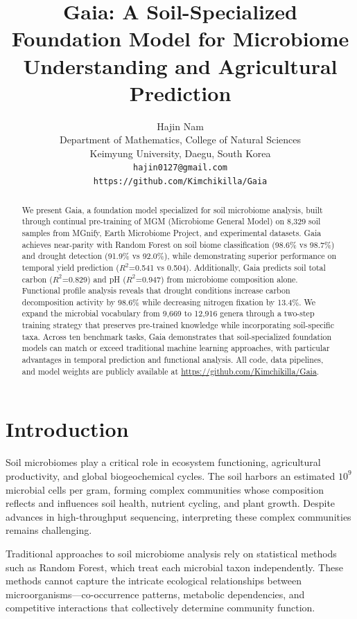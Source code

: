 \documentclass[11pt,a4paper]{article}
\title{Gaia: A Soil-Specialized Foundation Model for Microbiome Understanding and Agricultural Prediction}
\author{
  Hajin Nam \\
  Department of Mathematics, College of Natural Sciences \\
  Keimyung University, Daegu, South Korea \\
  \texttt{hajin0127@gmail.com} \\
  \texttt{https://github.com/Kimchikilla/Gaia}
}
\date{}
\begin{document}
\maketitle

\begin{abstract}
We present Gaia, a foundation model specialized for soil microbiome analysis, built through continual pre-training of MGM (Microbiome General Model) on 8,329 soil samples from MGnify, Earth Microbiome Project, and experimental datasets. Gaia achieves near-parity with Random Forest on soil biome classification (98.6\% vs 98.7\%) and drought detection (91.9\% vs 92.0\%), while demonstrating superior performance on temporal yield prediction ($R^2$=0.541 vs 0.504). Additionally, Gaia predicts soil total carbon ($R^2$=0.829) and pH ($R^2$=0.947) from microbiome composition alone. Functional profile analysis reveals that drought conditions increase carbon decomposition activity by 98.6\% while decreasing nitrogen fixation by 13.4\%. We expand the microbial vocabulary from 9,669 to 12,916 genera through a two-step training strategy that preserves pre-trained knowledge while incorporating soil-specific taxa. Across ten benchmark tasks, Gaia demonstrates that soil-specialized foundation models can match or exceed traditional machine learning approaches, with particular advantages in temporal prediction and functional analysis. All code, data pipelines, and model weights are publicly available at \url{https://github.com/Kimchikilla/Gaia}.
\end{abstract}

\section{Introduction}

Soil microbiomes play a critical role in ecosystem functioning, agricultural productivity, and global biogeochemical cycles. The soil harbors an estimated $10^9$ microbial cells per gram, forming complex communities whose composition reflects and influences soil health, nutrient cycling, and plant growth. Despite advances in high-throughput sequencing, interpreting these complex communities remains challenging.

Traditional approaches to soil microbiome analysis rely on statistical methods such as Random Forest, which treat each microbial taxon independently. These methods cannot capture the intricate ecological relationships between microorganisms---co-occurrence patterns, metabolic dependencies, and competitive interactions that collectively determine community function.
\end{document}
